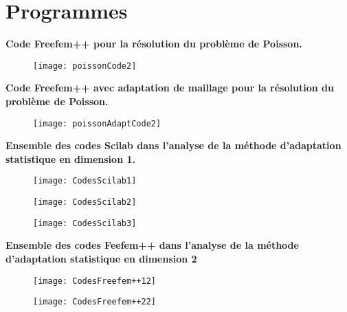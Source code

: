 \section*{Programmes}
\begin{flushleft}
\textbf{Code Freefem++ pour la résolution du problème de Poisson.}
\end{flushleft}
\begin{figure}[!h]
\centering
\texttt{[image: poissonCode2]}
\end{figure}
\newpage
\textbf{Code Freefem++ avec adaptation de maillage pour la résolution du problème de Poisson.}
\begin{figure}[!h]
\centering
\texttt{[image: poissonAdaptCode2]}
\end{figure}
\newpage
\textbf{Ensemble des codes Scilab dans l'analyse de la méthode d'adaptation statistique en dimension 1.}
\begin{figure}[!h]
\centering
\texttt{[image: CodesScilab1]}
\end{figure}
\begin{figure}[!h]
\centering
\texttt{[image: CodesScilab2]}
\end{figure}
\begin{figure}[!h]
\centering
\texttt{[image: CodesScilab3]}
\end{figure}
\[\]\[\]
\textbf{Ensemble des codes Feefem++ dans l'analyse de la méthode d'adaptation statistique en dimension 2}
\begin{figure}[!h]
\centering
\texttt{[image: CodesFreefem++12]}
\end{figure}
\begin{figure}[!h]
\centering
\texttt{[image: CodesFreefem++22]}
\end{figure}